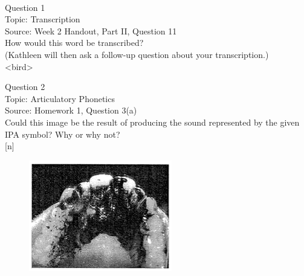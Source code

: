 \documentclass[12pt]{article}
\begin{document}
\newpage

\begin{center}
\textbf{{\color{red}{\HUGE END OF EXAM}}}\\

\end{center}
\newpage

\begin{center}
\textbf{{\color{blue}{\HUGE START OF EXAM\\}}}

\textbf{{\color{blue}{\HUGE Student ID: 19086\\}}}

\textbf{{\color{blue}{\HUGE \\}}}

\end{center}
\newpage

{\large Question 1}\\

Topic: Transcription\\
Source: Week 2 Handout, Part II, Question 11\\

How would this word be transcribed?\\ (Kathleen will then ask a follow-up question about your transcription.)\\

<bird>


\newpage

{\large Question 2}\\

Topic: Articulatory Phonetics\\
Source: Homework 1, Question 3(a)\\

Could this image be the result of producing the sound represented by the given IPA symbol? Why or why not?\\

{[n]}

\begin{figure}[H]
\includegraphics{../images/staticpalatography_stop.png}
\end{figure}
\end{document}
